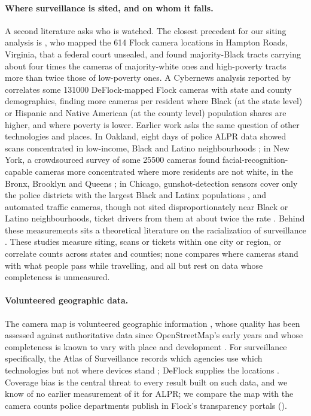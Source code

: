 \documentclass[11pt,twoside]{article}
\newcommand{\alpr}{ALPR\xspace}
\begin{document}
\paragraph{Where surveillance is sited, and on whom it falls.} A second literature asks who is
watched. The closest precedent for our siting analysis is \citet{keener2026}, who mapped the 614
Flock camera locations in Hampton Roads, Virginia, that a federal court unsealed, and found
majority-Black tracts carrying about four times the cameras of majority-white ones and
high-poverty tracts more than twice those of low-poverty ones. A Cybernews analysis reported by \citet{cybernews2026} correlates
some \num{131000} DeFlock-mapped Flock cameras with state and county demographics, finding more
cameras per resident where Black (at the state level) or Hispanic and Native American (at the
county level) population shares are higher, and where poverty is lower. Earlier work asks the
same question of other technologies and places. In Oakland, eight days of police \alpr data
showed scans concentrated in low-income, Black and Latino neighbourhoods \citep{maass2015}; in
New York, a crowdsourced survey of some \num{25500} cameras found facial-recognition-capable
cameras more concentrated where more residents are not white, in the Bronx, Brooklyn and
Queens \citep{amnesty2022}; in Chicago,
gunshot-detection sensors cover only the police districts with the largest Black and Latinx
populations \citep{macarthur2021}, and automated traffic cameras, though not sited
disproportionately near Black or Latino neighbourhoods, ticket drivers from them at about twice
the rate \citep{sutton2022,hopkins2022}. Behind these measurements sits a theoretical literature
on the racialization of surveillance \citep{browne2015,benjamin2019}. These studies measure
siting, scans or tickets within one city or region, or correlate counts across states and
counties; none compares where cameras stand with what people pass while travelling, and all but
\citet{keener2026} rest on data whose completeness is unmeasured.

\paragraph{Volunteered geographic data.} The camera map is volunteered geographic information
\citep{goodchild2007}, whose quality has been assessed against authoritative data since
OpenStreetMap's early years \citep{haklay2010} and whose completeness is known to vary with place
and development \citep{herfort2023}. For surveillance specifically, the Atlas of Surveillance
records which agencies use which technologies but not where devices stand \citep{atlas}; DeFlock
supplies the locations \citep{deflock}. Coverage bias is the central threat to every result built
on such data, and we know of no earlier measurement of it for \alpr; we compare the map with the
camera counts police departments publish in Flock's transparency portals
().
\end{document}
